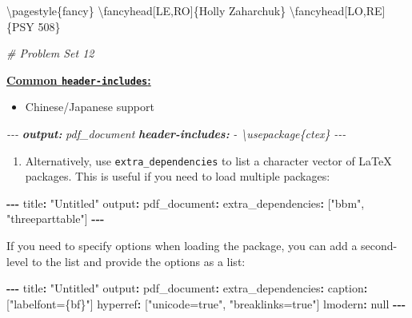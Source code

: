 \documentclass[
]{book}
\newenvironment{Shaded}{\begin{snugshade}}{\end{snugshade}}
\newcommand{\AnnotationTok}[1]{\textcolor[rgb]{0.56,0.35,0.01}{\textbf{\textit{#1}}}}
\newcommand{\CommentTok}[1]{\textcolor[rgb]{0.56,0.35,0.01}{\textit{#1}}}
\newcommand{\DecValTok}[1]{\textcolor[rgb]{0.00,0.00,0.81}{#1}}
\newcommand{\NormalTok}[1]{#1}
\newcommand{\SpecialCharTok}[1]{\textcolor[rgb]{0.81,0.36,0.00}{\textbf{#1}}}
\newcommand{\StringTok}[1]{\textcolor[rgb]{0.31,0.60,0.02}{#1}}
\providecommand{\tightlist}{%
  \setlength{\itemsep}{0pt}\setlength{\parskip}{0pt}}
\theoremstyle{definition}
\theoremstyle{definition}
\theoremstyle{definition}
\theoremstyle{definition}
\theoremstyle{remark}
\begin{document}
\begin{itemize}
\begin{Shaded}
\begin{Highlighting}[]
\NormalTok{\textbackslash{}pagestyle\{fancy\}}
\NormalTok{\textbackslash{}fancyhead[LE,RO]\{Holly Zaharchuk\}}
\NormalTok{\textbackslash{}fancyhead[LO,RE]\{PSY }\DecValTok{508}\NormalTok{\}}

\CommentTok{\# Problem Set 12}
\end{Highlighting}
\end{Shaded}

  \href{https://github.com/hao203/rmarkdown-YAML?tab=readme-ov-file\#header-includes}{\textbf{Common \texttt{header-includes}:}}

  \begin{itemize}
  \tightlist
  \item
    Chinese/Japanese support
  \end{itemize}

\begin{Shaded}
\begin{Highlighting}[]
\CommentTok{{-}{-}{-}}
\AnnotationTok{output:}\CommentTok{ pdf\_document}
\AnnotationTok{header{-}includes:}
\CommentTok{  {-} \textbackslash{}usepackage\{ctex\}}
\CommentTok{{-}{-}{-}}
\end{Highlighting}
\end{Shaded}

  \begin{enumerate}
  \def\labelenumi{\arabic{enumi}.}
  \setcounter{enumi}{1}
  \tightlist
  \item
    Alternatively, use \texttt{extra\_dependencies} to list a character vector of LaTeX packages. This is useful if you need to load multiple packages:
  \end{enumerate}

\begin{Shaded}
\begin{Highlighting}[]
\SpecialCharTok{{-}{-}{-}}
\NormalTok{title}\SpecialCharTok{:} \StringTok{"Untitled"}
\NormalTok{output}\SpecialCharTok{:} 
\NormalTok{  pdf\_document}\SpecialCharTok{:}
\NormalTok{    extra\_dependencies}\SpecialCharTok{:}\NormalTok{ [}\StringTok{"bbm"}\NormalTok{, }\StringTok{"threeparttable"}\NormalTok{]}
\SpecialCharTok{{-}{-}{-}}
\end{Highlighting}
\end{Shaded}

  If you need to specify options when loading the package, you can add a second-level to the list and provide the options as a list:

\begin{Shaded}
\begin{Highlighting}[]
\SpecialCharTok{{-}{-}{-}}
\NormalTok{title}\SpecialCharTok{:} \StringTok{"Untitled"}
\NormalTok{output}\SpecialCharTok{:} 
\NormalTok{  pdf\_document}\SpecialCharTok{:}
\NormalTok{    extra\_dependencies}\SpecialCharTok{:}
\NormalTok{      caption}\SpecialCharTok{:}\NormalTok{ [}\StringTok{"labelfont=\{bf\}"}\NormalTok{]}
\NormalTok{      hyperref}\SpecialCharTok{:}\NormalTok{ [}\StringTok{"unicode=true"}\NormalTok{, }\StringTok{"breaklinks=true"}\NormalTok{]}
\NormalTok{      lmodern}\SpecialCharTok{:}\NormalTok{ null}
\SpecialCharTok{{-}{-}{-}}
\end{Highlighting}
\end{Shaded}


\end{itemize}
\end{document}
